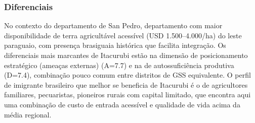 \subsubsection*{Diferenciais}\label{dif-itacurubi-0207}
No contexto do departamento de San Pedro, departamento com maior disponibilidade de terra agricultável acessível (USD 1.500–4.000/ha) do leste paraguaio, com presença brasiguaia histórica que facilita integração. Os diferenciais mais marcantes de Itacurubi estão na dimensão de posicionamento estratégico (ameaças externas) (A=7.7) e na de autossuficiência produtiva (D=7.4), combinação pouco comum entre distritos de GSS equivalente. O perfil de imigrante brasileiro que melhor se beneficia de Itacurubi é o de agricultores familiares, pecuaristas, pioneiros rurais com capital limitado, que encontra aqui uma combinação de custo de entrada acessível e qualidade de vida acima da média regional.
